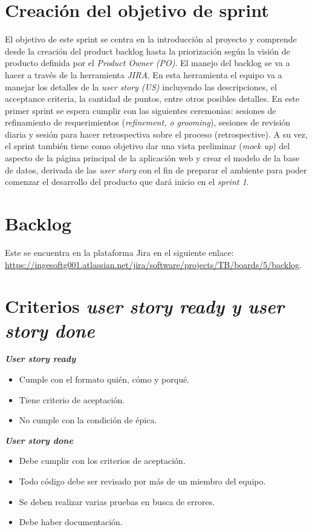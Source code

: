 \documentclass{article}
\begin{document}
\section{Creación del objetivo de sprint}
El objetivo de este sprint se centra en la introducción al proyecto y
comprende desde la creación del product backlog hasta la priorización
según la visión de producto definida por el \textit{Product Owner (PO)}.
El manejo del backlog se va a hacer a través de la herramienta \textit{JIRA}.
En esta herramienta el equipo va a manejar los detalles de la
\textit{user story (US)} incluyendo las descripciones, el acceptance
criteria, la cantidad de puntos, entre otros posibles detalles. En este
primer sprint se espera cumplir con las siguientes ceremonias: sesiones
de refinamiento de requerimientos (\textit{refinement, o grooming}),
sesiones de revisión diaria y sesión para hacer retrospectiva sobre el
proceso (retrospective). A su vez, el sprint también tiene como objetivo
dar una vista preliminar (\textit{mock up}) del aspecto de la página principal de
la aplicación web y crear el modelo de la base de datos, derivada de las
\textit{user story} con el fin de preparar el ambiente para poder comenzar
el desarrollo del producto que dará inicio en el \textit{sprint 1}. 

\section{Backlog}
Este se encuentra en la plataforma Jira en el siguiente enlace:
\url{https://ingesoftg001.atlassian.net/jira/software/projects/TB/boards/5/backlog}.

\section{Criterios \textit{user story ready y user story done}}
\textbf{\textit{User story ready}}
\begin{itemize}
  \item Cumple con el formato quién, cómo y porqué.
  \item Tiene criterio de aceptación.
  \item No cumple con la condición de épica.
\end{itemize}
    
\textbf{\textit{User story done}}
\begin{itemize}
  \item Debe cumplir con los criterios de aceptación.
  \item Todo código debe ser revisado por más de un miembro del equipo.
  \item Se deben realizar varias pruebas en busca de errores.
  \item Debe haber documentación.
\end{itemize}
\end{document}
